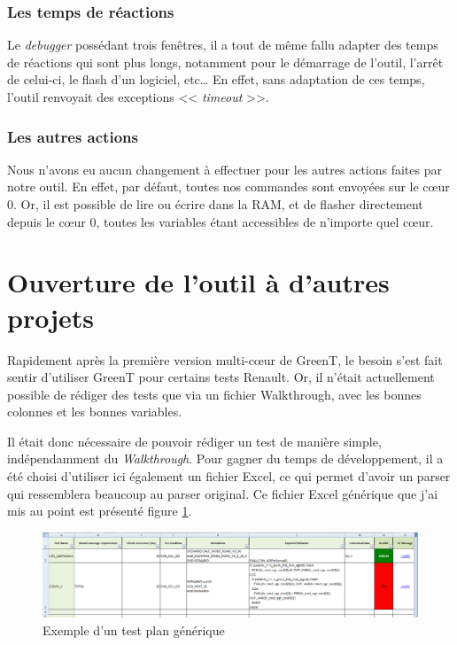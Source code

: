 \subsubsection{Les temps de réactions}
Le \textit{debugger} possédant trois fenêtres, il a tout de même fallu adapter des temps de réactions qui sont plus longs, notamment pour le démarrage de l'outil, l'arrêt de celui-ci, le flash d'un logiciel, etc… En effet, sans adaptation de ces temps, l'outil renvoyait des exceptions << \textit{timeout} >>.

\subsubsection{Les autres actions}
Nous n'avons eu aucun changement à effectuer pour les autres actions faites par notre outil. En effet, par défaut, toutes nos commandes sont envoyées sur le cœur 0. Or, il est possible de lire ou écrire dans la RAM, et de flasher directement depuis le cœur 0, toutes les variables étant accessibles de n'importe quel cœur. 

\section{Ouverture de l'outil à d'autres projets} \label{gttestplan}
Rapidement après la première version multi-cœur de GreenT, le besoin s'est fait sentir d'utiliser GreenT pour certains tests Renault. Or, il n'était actuellement possible de rédiger des tests que via un fichier Walkthrough, avec les bonnes colonnes et les bonnes variables. 

Il était donc nécessaire de pouvoir rédiger un test de manière simple, indépendamment du \textit{Walkthrough}. Pour gagner du temps de développement, il a été choisi d'utiliser ici également un fichier Excel, ce qui permet d'avoir un parser qui ressemblera beaucoup au parser original. Ce fichier Excel générique que j'ai mis au point est présenté figure \ref{fig:gttestplan}. 


\begin{figure}[h]
\hspace{-40px}
\includegraphics[width=1.15\linewidth]{contents/images/gttestplan}
\caption{Exemple d'un test plan générique}
\label{fig:gttestplan}
\end{figure}

